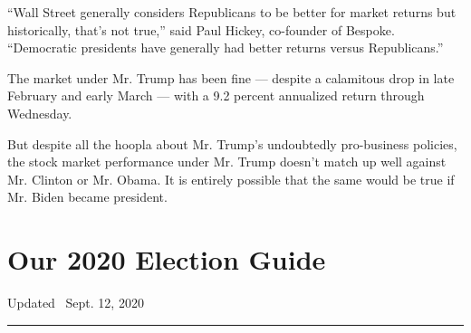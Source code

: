 ``Wall Street generally considers Republicans to be better for market
returns but historically, that's not true,'' said Paul Hickey,
co-founder of Bespoke. ``Democratic presidents have generally had better
returns versus Republicans.''

The market under Mr. Trump has been fine --- despite a calamitous drop
in late February and early March --- with a 9.2 percent annualized
return through Wednesday.

But despite all the hoopla about Mr. Trump's undoubtedly pro-business
policies, the stock market performance under Mr. Trump doesn't match up
well against Mr. Clinton or Mr. Obama. It is entirely possible that the
same would be true if Mr. Biden became president.

\hypertarget{our-2020-election-guide}{%
\section{Our 2020 Election Guide}\label{our-2020-election-guide}}

Updated ~Sept. 12, 2020

\begin{center}\rule{0.5\linewidth}{\linethickness}\end{center}

